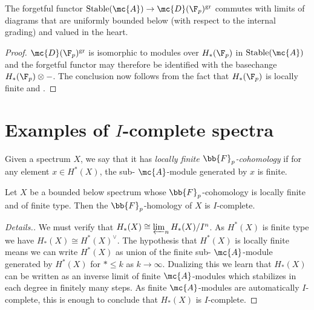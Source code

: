 \begin{corr} \label{cor:lim-underlying}
    The forgetful functor $\mathrm{Stable}(\mc{A}) \to \mc{D}(\F_p)^{\mathrm{gr}}$ commutes with 
    limits of diagrams that are uniformly bounded below (with respect to the internal grading) and valued in the heart.
\end{corr}

\begin{proof}
    $\mc{D}(\F_p)^{\mathrm{gr}}$ is isomorphic to modules over $H_*(\F_p)$ in $\mathrm{Stable}(\mc{A})$ and the forgetful functor may therefore be identified with the basechange $H_*(\F_p) \otimes -$.
    The conclusion now follows from the fact that $H_*(\F_p)$ is locally finite and .
\end{proof}

\section{Examples of $I$-complete spectra} \label{examples}

\begin{defn} \label{defnlocallyfinite}
Given a spectrum $X$, we say that it has \emph{locally finite $\bb{F}_p$-cohomology} if for any element $x \in H^{*}(X)$, the sub- $\mc{A}$-module generated by $x$ is finite.
\end{defn}

\begin{ex}
    Let $X$ be a bounded below spectrum whose $\bb{F}_p$-cohomology is locally finite and of finite type. Then the $\bb{F}_p$-homology of $X$ is $I$-complete.
\end{ex}

\begin{proof}[Details.]    
    We must verify that $H_{*}(X) \cong \varprojlim_n H_{*}(X)/I^n$.
    As $H^*(X)$ is finite type we have $H_*(X) \cong H^*(X)^\vee$.
    The hypothesis that $H^*(X)$ is locally finite means we can write $H^*(X)$ as union of the finite sub- $\mc{A}$-module generated by $H^*(X)$ for $* \leq k$ as $k \to \infty$.
    Dualizing this we learn that $H_*(X)$ can be written as an inverse limit of finite $\mc{A}$-modules which stabilizes in each degree in finitely many steps.
    As finite $\mc{A}$-modules are automatically $I$-complete, this is enough to conclude that
    $H_*(X)$ is $I$-complete. 
\end{proof}

    
    



